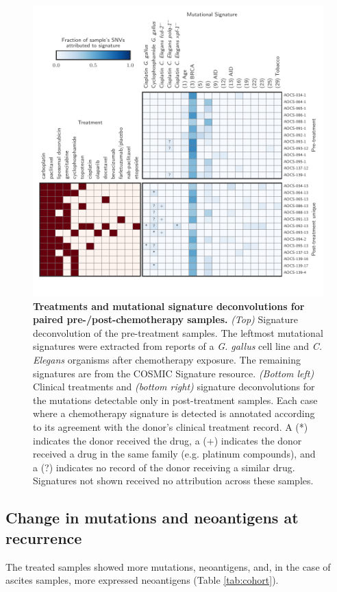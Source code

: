 \begin{figure}[htbp]
\centering
\includegraphics[scale=1.0]{figures/signatures.pdf}
\caption{\textbf{Treatments and mutational signature deconvolutions for paired pre-/post-chemotherapy samples.} \textit{(Top)} Signature deconvolution of the pre-treatment samples. The leftmost mutational signatures were extracted from reports of a \textit{G. gallus}\cite{Szikriszt_2016} cell line and \textit{C. Elegans}\cite{Meier_2014} organisms after chemotherapy exposure. The remaining signatures are from the COSMIC Signature resource\cite{364242}. \textit{(Bottom left)} Clinical treatments and \textit{(bottom right)} signature deconvolutions for the mutations detectable only in post-treatment samples. Each case where a chemotherapy signature is detected is annotated according to its agreement with the donor's clinical treatment record. A (*) indicates the donor received the drug, a (+) indicates the donor received a drug in the same family (e.g. platinum compounds), and a (?) indicates no record of the donor receiving a similar drug. Signatures not shown received no attribution across these samples.}
\label{fig:signatures}
\end{figure}

\subsection*{Change in mutations and neoantigens at recurrence}
The treated samples showed more mutations, neoantigens, and, in the case of ascites samples, more expressed neoantigens (Table \ref{tab:cohort}).

